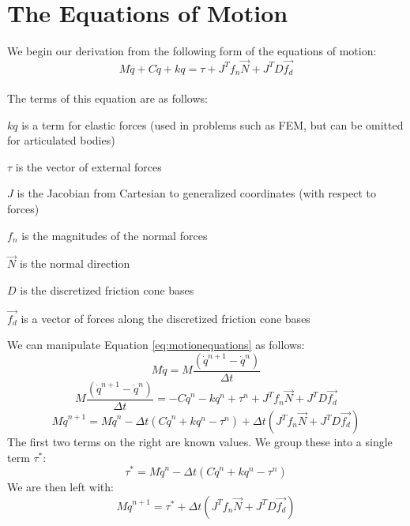 \section{The Equations of Motion}
We begin our derivation from the following form of the equations of motion:
\begin{equation}
\label{eq:motionequations}
M\ddot{q} + C\dot{q} + kq = \tau + J^T{f_n}\vec{N} + J^TD\vec{f_d}
\end{equation}
\\
The terms of this equation are as follows:
\begin{packed_item}
\item $kq$ is a term for elastic forces (used in problems such as FEM, but can be omitted for articulated bodies)
\item $\tau$ is the vector of external forces
\item $J$ is the Jacobian from Cartesian to generalized coordinates (with respect to forces)
\item $f_n$ is the magnitudes of the normal forces
\item $\vec{N}$ is the normal direction
\item $D$ is the discretized friction cone bases
\item $\vec{f_d}$ is a vector of forces along the discretized friction cone bases
\end{packed_item}
We can manipulate Equation \ref{eq:motionequations} as follows:
\begin{equation}
\label{eq:changemotionequations0}
M\ddot{q} = M\frac{(\dot{q}^{n+1}-\dot{q}^n)}{\Delta{t}}
\end{equation}
\begin{equation}
\label{eq:changemotionequations1}
M\frac{(\dot{q}^{n+1}-\dot{q}^n)}{\Delta{t}} = -C\dot{q}^n - kq^n + \tau^n + J^Tf_n\vec{N} + J^TD\vec{f_d} 
\end{equation}
\begin{equation}
\label{eq:changemotionequations2}
M\dot{q}^{n+1} = M\dot{q}^n - \Delta{t}(C\dot{q}^n + kq^n - \tau^n) + \Delta{t}(J^Tf_n\vec{N} + J^TD\vec{f_d})
\end{equation}
The first two terms on the right are known values. 
We group these into a single term $\tau^*$:
\begin{equation}
\label{eq:taustar}
\tau^* = M\dot{q}^n - \Delta{t}(C\dot{q}^n + kq^n - \tau^n)
\end{equation}
We are then left with:
\begin{equation}
\label{eq:changemotionequations3}
M\dot{q}^{n+1} = \tau^* + \Delta{t}(J^Tf_n\vec{N} + J^TD\vec{f_d})
\end{equation}

